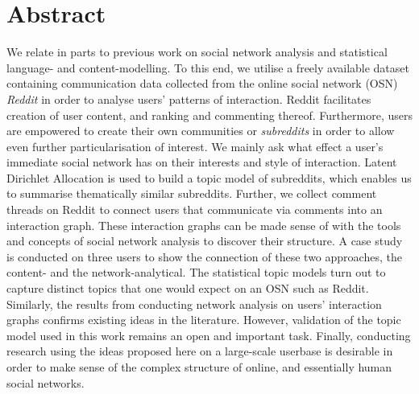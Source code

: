 \section*{Abstract}

We relate in parts to previous work on social network analysis and statistical language- and content-modelling.
To this end, we utilise a freely available dataset containing communication data collected from the online social network (OSN) \emph{Reddit} in order to analyse users' patterns of interaction.
Reddit facilitates creation of user content, and ranking and commenting thereof.
Furthermore, users are empowered to create their own communities or \emph{subreddits} in order to allow even further particularisation of interest.
We mainly ask what effect a user's immediate social network has on their interests and style of interaction.
Latent Dirichlet Allocation is used to build a topic model of subreddits, which enables us to summarise thematically similar subreddits.
Further, we collect comment threads on Reddit to connect users that communicate via comments into an interaction graph.
These interaction graphs can be made sense of with the tools and concepts of social network analysis to discover their structure.
A case study is conducted on three users to show the connection of these two approaches, the content- and the network-analytical.
The statistical topic models turn out to capture distinct topics that one would expect on an OSN such as Reddit.
Similarly, the results from conducting network analysis on users' interaction graphs confirms existing ideas in the literature.
However, validation of the topic model used in this work remains an open and important task.
Finally, conducting research using the ideas proposed here on a large-scale userbase is desirable in order to make sense of the complex structure of online, and essentially human social networks.

